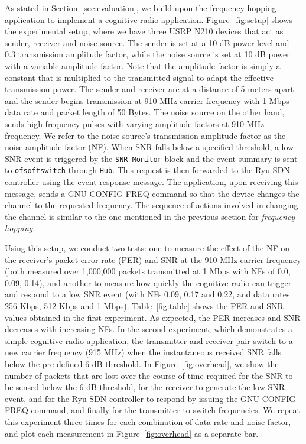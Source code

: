 As stated in Section~\ref{sec:evaluation}, we build upon the frequency hopping application to implement a cognitive radio application. Figure~\ref{fig:setup} shows the experimental setup, where we have three USRP N210 devices that act as sender, receiver and noise source. The sender is set at a 10 dB power level and 0.3 transmission amplitude factor, while the noise source is set at 10 dB power with a variable amplitude factor. Note that the amplitude factor is simply a constant that is multiplied to the transmitted signal to adapt the effective transmission power. The sender and receiver are at a distance of 5 meters apart and the sender begins transmission at 910 MHz carrier frequency with 1 Mbps data rate and packet length of 50 Bytes. The noise source on the other hand, sends high frequency pulses with varying amplitude factors at 910 MHz frequency. We refer to the noise source's transmission amplitude factor as the noise amplitude factor (NF). When SNR falls below a specified threshold, a low SNR event is triggered by the \texttt{SNR Monitor} block and the event summary is sent to \texttt{ofsoftswitch} through \texttt{\crossflow Hub}. This request is then forwarded to the Ryu SDN controller using the event response message. The application, upon receiving this message, sends a {GNU-CONFIG-FREQ} command so that the device changes the channel to the requested frequency. The sequence of actions involved in changing the channel is similar to the one mentioned in the previous section for \emph{frequency hopping}.

Using this setup, we conduct two tests: one to measure the effect of the NF on the receiver's packet error rate (PER) and SNR at the 910 MHz carrier frequency (both measured over 1,000,000 packets transmitted at 1 Mbps with NFs of 0.0, 0.09, 0.14), and another to measure how quickly the cognitive radio can trigger and respond to a low SNR event (with NFs 0.09, 0.17 and 0.22, and data rates 256 Kbps, 512 Kbps and 1 Mbps).
Table~\ref{fig:table} shows the PER and SNR values obtained in the first experiment. As expected, the PER increases and SNR decreases with increasing NFs.
In the second experiment, which demonstrates a simple cognitive radio application, the transmitter and receiver pair switch to a new carrier frequency (915 MHz) when the instantaneous received SNR falls below the pre-defined 6 dB threshold. In Figure~\ref{fig:overhead}, we show the number of packets that are lost over the course of time required for the SNR to be sensed below the 6 dB threshold, for the receiver to generate the low SNR event, and for the Ryu SDN controller to respond by issuing the {GNU-CONFIG-FREQ} command, and finally for the transmitter to switch frequencies. We repeat this experiment three times for each combination of data rate and noise factor, and plot each measurement in Figure~\ref{fig:overhead} as a separate bar.   
